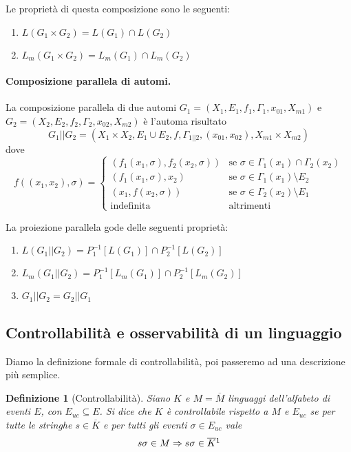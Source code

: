 \documentclass[a4paper, 11pt]{article}
\newcommand{\revp}[1]{P_{#1}^{-1}}
\newtheorem{definit}{Definizione}[subsection]
\begin{document}
Le proprietà di questa composizione sono le seguenti: \begin{enumerate}
	\item $L(G_1 \times G_2) = L(G_1) \cap L(G_2)$
	\item $L_m(G_1 \times G_2) = L_m(G_1) \cap L_m(G_2)$
\end{enumerate}

\paragraph{Composizione parallela di automi.} La composizione parallela di due automi $G_1 = (X_1, E_1, f_1, \Gamma_1, x_{01}, X_{m1})$ e $G_2 = (X_2, E_2, f_2, \Gamma_2, x_{02}, X_{m2})$ è l'automa risultato \[ G_1 \vert\vert G_2 = (X_1 \times X_2, E_1 \cup E_2,f,\Gamma_{1 \vert \vert 2}, (x_{01}, x_{02}), X_{m1} \times X_{m2}) \]
dove \[ 
	f((x_1, x_2), \sigma) = \begin{cases}
	(f_1(x_1, \sigma), f_2(x_2, \sigma)) &\text{se } \sigma \in \Gamma_1(x_1) \cap \Gamma_2(x_2) \\
	(f_1(x_1, \sigma), x_2) &\text{se } \sigma \in \Gamma_1(x_1) \setminus E_2 \\
	(x_1, f(x_2, \sigma)) &\text{se } \sigma \in \Gamma_2(x_2) \setminus E_1 \\
	\text{indefinita} &\text{altrimenti}
	\end{cases}
 \]
 
La proiezione parallela gode delle seguenti proprietà:\begin{enumerate}
	\item $L(G_1 \vert \vert G_2) = \revp{1}\left[ L(G_1) \right] \cap \revp{2}\left[ L(G_2) \right] $
	\item $L_m(G_1 \vert \vert G_2) = \revp{1}\left[ L_m(G_1) \right] \cap \revp{2}\left[ L_m(G_2) \right] $
	\item $G_1 \vert \vert G_2 = G_2 \vert \vert G_1$
\end{enumerate}

\subsection{Controllabilità e osservabilità di un linguaggio}

Diamo la definizione formale di controllabilità, poi passeremo ad una descrizione più semplice.
\begin{definit}[Controllabilità]
	Siano $K$ e $M = \overline{M}$ linguaggi dell'alfabeto di eventi $E$, con $E_{uc} \subseteq E$. Si dice che $K$ è controllabile rispetto a $M$ e $E_{uc}$ se per tutte le stringhe $s \in \overline{K}$ e per tutti gli eventi $\sigma \in E_{uc}$ vale \[s \sigma \in M \Rightarrow s\sigma \in \overline{K}\footnotemark \]
\end{definit}
\end{document}
